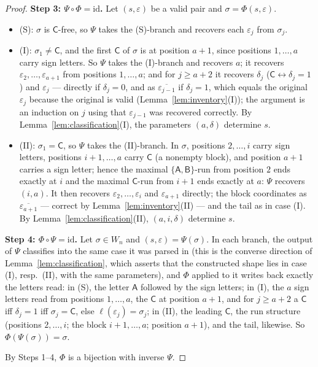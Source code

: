 \documentclass[11pt]{article}
\theoremstyle{definition}
\theoremstyle{remark}
\newcommand{\sA}{\mathsf{A}}
\newcommand{\sB}{\mathsf{B}}
\newcommand{\sC}{\mathsf{C}}
\newcommand{\Wn}{W_n}
\begin{document}
\begin{proof}
\textbf{Step 3: $\Psi\circ\Phi=\mathrm{id}$.} Let $(s,\varepsilon)$ be a
valid pair and $\sigma=\Phi(s,\varepsilon)$.
\begin{itemize}
\item (S): $\sigma$ is $\sC$-free, so $\Psi$ takes the (S)-branch and
 recovers each $\varepsilon_j$ from $\sigma_j$.
\item (I): $\sigma_1\neq\sC$, and the first $\sC$ of $\sigma$ is at
 position $a+1$, since positions $1,\dots,a$ carry sign letters. So $\Psi$
 takes the (I)-branch and recovers $a$; it recovers
 $\varepsilon_2,\dots,\varepsilon_{a+1}$ from positions $1,\dots,a$; and
 for $j\ge a+2$ it recovers $\delta_j$ ($\sC\leftrightarrow\delta_j=1$) and
 $\varepsilon_j$ --- directly if $\delta_j=0$, and as
 $\overline{\varepsilon_{j-1}}$ if $\delta_j=1$, which equals the original
 $\varepsilon_j$ because the original is valid
 (Lemma~\ref{lem:inventory}(I)); the argument is an induction on $j$ using
 that $\varepsilon_{j-1}$ was recovered correctly. By
 Lemma~\ref{lem:classification}(I), the parameters $(a,\delta)$ determine
 $s$.
\item (II): $\sigma_1=\sC$, so $\Psi$ takes the (II)-branch. In $\sigma$,
 positions $2,\dots,i$ carry sign letters, positions $i+1,\dots,a$ carry
 $\sC$ (a nonempty block), and position $a+1$ carries a sign letter; hence
 the maximal $\{\sA,\sB\}$-run from position $2$ ends exactly at $i$ and
 the maximal $\sC$-run from $i+1$ ends exactly at $a$: $\Psi$ recovers
 $(i,a)$. It then recovers $\varepsilon_2,\dots,\varepsilon_i$ and
 $\varepsilon_{a+1}$ directly; the block coordinates as
 $\overline{\varepsilon_{a+1}}$ --- correct by
 Lemma~\ref{lem:inventory}(II) --- and the tail as in case (I). By
 Lemma~\ref{lem:classification}(II), $(a,i,\delta)$ determine $s$.
\end{itemize}

\textbf{Step 4: $\Phi\circ\Psi=\mathrm{id}$.} Let $\sigma\in\Wn$ and
$(s,\varepsilon)=\Psi(\sigma)$. In each branch, the output of $\Psi$
classifies into the same case it was parsed in (this is the converse
direction of Lemma~\ref{lem:classification}, which asserts that the
constructed shape lies in case (I), resp.\ (II), with the same parameters),
and $\Phi$ applied to it writes back exactly the letters read: in (S), the
letter $\sA$ followed by the sign letters; in (I), the $a$ sign letters
read from positions $1,\dots,a$, the $\sC$ at position $a+1$, and for
$j\ge a+2$ a $\sC$ iff $\delta_j=1$ iff $\sigma_j=\sC$, else
$\ell(\varepsilon_j)=\sigma_j$; in (II), the leading $\sC$, the run
structure (positions $2,\dots,i$; the block $i+1,\dots,a$; position
$a+1$), and the tail, likewise. So $\Phi(\Psi(\sigma))=\sigma$.

By Steps 1--4, $\Phi$ is a bijection with inverse $\Psi$.
\end{proof}
\end{document}
